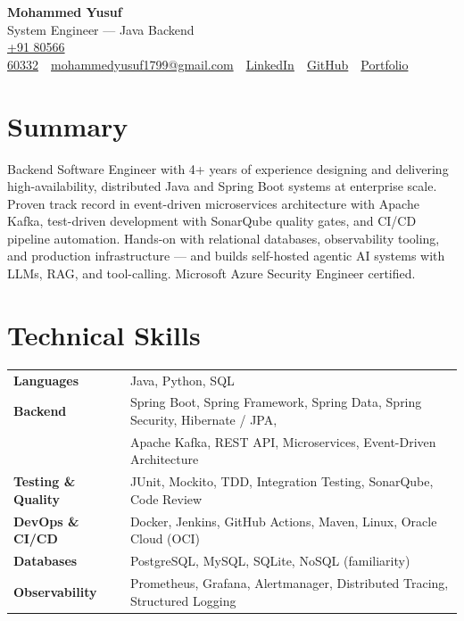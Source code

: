 \documentclass[9pt, letterpaper]{extarticle}
\begin{document}
\begin{center}
  {\Large\bfseries\color{accent} Mohammed Yusuf} \\[1pt]
  {\small System Engineer --- Java Backend} \\[1pt]
  {\small
    \href{tel:+918056660332}{+91 80566 60332}\ \textbar\
    \href{mailto:mohammedyusuf1799@gmail.com}{mohammedyusuf1799@gmail.com}\ \textbar\
    \href{https://www.linkedin.com/in/yusuf1799/}{LinkedIn}\ \textbar\
    \href{https://github.com/md-yusuf-f}{GitHub}\ \textbar\
    \href{https://portfolio.safnetworks.com}{Portfolio}
  }
\end{center}

\section{Summary}

Backend Software Engineer with 4+ years of experience designing and delivering high-availability,
distributed Java and Spring Boot systems at enterprise scale. Proven track record in event-driven
microservices architecture with Apache Kafka, test-driven development with SonarQube quality
gates, and CI/CD pipeline automation. Hands-on with relational databases, observability tooling, and
production infrastructure --- and builds self-hosted agentic AI systems with LLMs, RAG, and tool-calling.
Microsoft Azure Security Engineer certified.

\section{Technical Skills}

\begin{tabularx}{\textwidth}{@{} l X @{}}
  \textbf{Languages}         & Java, Python, SQL \\[1pt]
  \textbf{Backend}           & Spring Boot, Spring Framework, Spring Data, Spring Security, Hibernate / JPA, \\
                             & Apache Kafka, REST API, Microservices, Event-Driven Architecture \\[1pt]
  \textbf{Testing \& Quality} & JUnit, Mockito, TDD, Integration Testing, SonarQube, Code Review \\[1pt]
  \textbf{DevOps \& CI/CD}   & Docker, Jenkins, GitHub Actions, Maven, Linux, Oracle Cloud (OCI) \\[1pt]
  \textbf{Databases}         & PostgreSQL, MySQL, SQLite, NoSQL (familiarity) \\[1pt]
  \textbf{Observability}     & Prometheus, Grafana, Alertmanager, Distributed Tracing, Structured Logging \\[1pt]
\end{tabularx}
\end{document}
